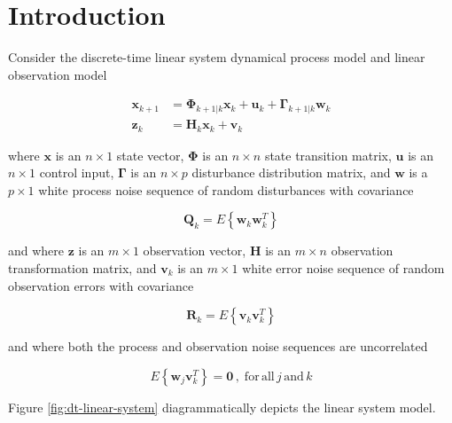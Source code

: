 \section{Introduction}
\label{Introduction}

Consider the discrete-time linear system dynamical process model and linear observation model

\begin{equation*}
    \begin{aligned}
        \mathbf{x}_{k+1} &= \mathbf{\Phi}_{k+1|k} \mathbf{x}_k + \mathbf{u}_k + \mathbf{\Gamma}_{k+1|k} \mathbf{w}_k \\
        \mathbf{z}_k &= \mathbf{H}_k \mathbf{x}_k + \mathbf{v}_k
    \end{aligned}
\end{equation*}

where $\mathbf{x}$ is an $n \times 1$ state vector,
$\mathbf{\Phi}$ is an $n \times n$ state transition matrix,
$\mathbf{u}$ is an $n \times 1$ control input,
$\mathbf{\Gamma}$ is an $n \times p$ disturbance distribution matrix,
and $\mathbf{w}$ is a $p \times 1$ white process noise sequence of random disturbances with covariance

\begin{equation*}
    \mathbf{Q}_k = E \left\{ \mathbf{w}_k \mathbf{w}_k^T \right\}
\end{equation*}

and where $\mathbf{z}$ is an $m \times 1$ observation vector,
$\mathbf{H}$ is an $m \times n$ observation transformation matrix,
and $\mathbf{v}_k$ is an $m \times 1$ white error noise sequence of random observation errors with covariance

\begin{equation*}
    \mathbf{R}_k = E \left\{ \mathbf{v}_k \mathbf{v}_k^T \right\}
\end{equation*}

and where both the process and observation noise sequences are uncorrelated

\begin{equation*}
    E \left\{ \mathbf{w}_j \mathbf{v}_k^T \right\} = \mathbf{0} \, , \phantom{.} \mathrm{for} \, \mathrm{all} \, j \, \mathrm{and} \, k
\end{equation*}

Figure \ref{fig:dt-linear-system} diagrammatically depicts the linear system model.

